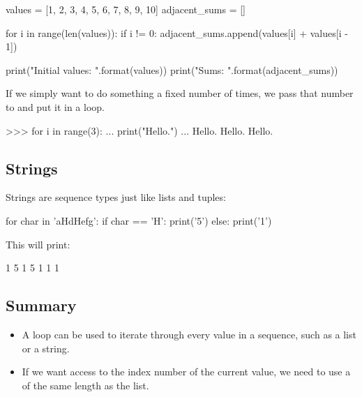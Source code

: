 \documentclass[11pt]{cselabheader}
\begin{document}
\begin{python3code}
values = [1, 2, 3, 4, 5, 6, 7, 8, 9, 10]
adjacent_sums = []

for i in range(len(values)):
    if i != 0:
        adjacent_sums.append(values[i] + values[i - 1])

print("Initial values: {}".format(values))
print("Sums: {}".format(adjacent_sums))
\end{python3code}

If we simply want to do something a fixed number of times, we pass that number
to  and put it in a loop.

\begin{pyconcode}
>>> for i in range(3):
...     print("Hello.")
...
Hello.
Hello.
Hello.
\end{pyconcode}

\subsection{Strings}

Strings are sequence types just like lists and tuples:

\begin{python3code}
for char in 'aHdHefg':
    if char == 'H':
        print('5')
    else:
        print('1')
\end{python3code}

This will print:

\begin{verbatimcode}
1
5
1
5
1
1
1
\end{verbatimcode}

\subsection{\protect{}}

\subsection{Summary}
\begin{itemize}
  \item A  loop can be used to iterate through every value in a
    sequence, such as a list or a string.
  \item If we want access to the index number of the current value, we need to
    use a  of the same length as the list.
\end{itemize}
\end{document}
